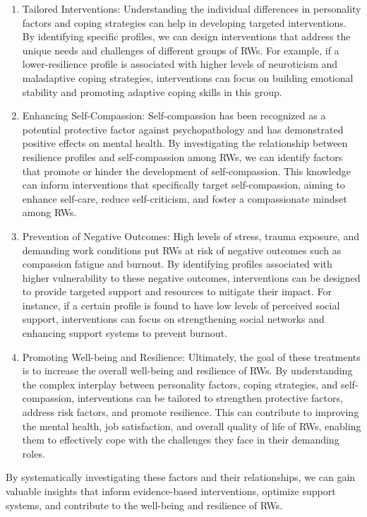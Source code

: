\documentclass[
  man]{apa7}
\begin{document}
\begin{enumerate}
\def\labelenumi{\arabic{enumi}.}
\item
  Tailored Interventions: Understanding the individual differences in personality factors and coping strategies can help in developing targeted interventions. By identifying specific profiles, we can design interventions that address the unique needs and challenges of different groups of RWs. For example, if a lower-resilience profile is associated with higher levels of neuroticism and maladaptive coping strategies, interventions can focus on building emotional stability and promoting adaptive coping skills in this group.
\item
  Enhancing Self-Compassion: Self-compassion has been recognized as a potential protective factor against psychopathology and has demonstrated positive effects on mental health. By investigating the relationship between resilience profiles and self-compassion among RWs, we can identify factors that promote or hinder the development of self-compassion. This knowledge can inform interventions that specifically target self-compassion, aiming to enhance self-care, reduce self-criticism, and foster a compassionate mindset among RWs.
\item
  Prevention of Negative Outcomes: High levels of stress, trauma exposure, and demanding work conditions put RWs at risk of negative outcomes such as compassion fatigue and burnout. By identifying profiles associated with higher vulnerability to these negative outcomes, interventions can be designed to provide targeted support and resources to mitigate their impact. For instance, if a certain profile is found to have low levels of perceived social support, interventions can focus on strengthening social networks and enhancing support systems to prevent burnout.
\item
  Promoting Well-being and Resilience: Ultimately, the goal of these treatments is to increase the overall well-being and resilience of RWs. By understanding the complex interplay between personality factors, coping strategies, and self-compassion, interventions can be tailored to strengthen protective factors, address risk factors, and promote resilience. This can contribute to improving the mental health, job satisfaction, and overall quality of life of RWs, enabling them to effectively cope with the challenges they face in their demanding roles.
\end{enumerate}

By systematically investigating these factors and their relationships, we can gain valuable insights that inform evidence-based interventions, optimize support systems, and contribute to the well-being and resilience of RWs.
\end{document}
